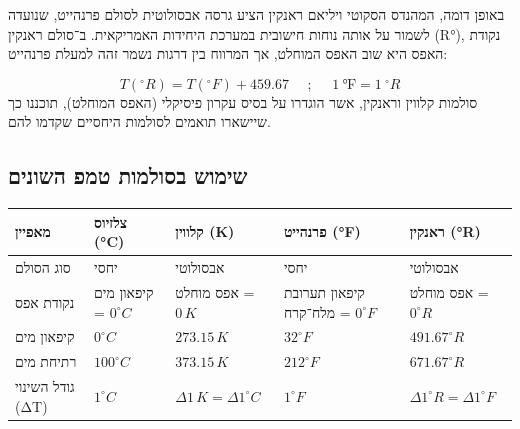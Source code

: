 \documentclass[
  hebrew,
  letterpaper,
  DIV=11,
  numbers=noendperiod]{scrreprt}
\begin{document}
{באופן דומה, המהנדס הסקוטי ויליאם ראנקין הציע גרסה אבסולוטית לסולם
פרנהייט, שנועדה לשמור על אותה נוחות חישובית במערכת היחידות האמריקאית}.
{ב־סולם ראנקין} (R°){,} {נקודת האפס היא שוב האפס המוחלט, אך המרווח בין
דרגות נשמר זהה למעלת פרנהייט}:

\[T({^\circ}R) = T({^\circ}F) + 459.67\ \ \ \ \ \ ;\ \ \ \ \ \ 1\ ℉ = 1\ {^\circ}R\]
{סולמות קלווין וראנקין, אשר הוגדרו על בסיס עקרון פיסיקלי (האפס המוחלט),
תוכננו כך שיישארו תואמים לסולמות היחסיים שקדמו להם}. {}

\subsection{\texorpdfstring{{שימוש בסולמות טמפ\textquotesingle{}
השונים}}{שימוש בסולמות טמפ\textquotesingle{} השונים}}\label{ux5e9ux5d9ux5deux5d5ux5e9-ux5d1ux5e1ux5d5ux5dcux5deux5d5ux5ea-ux5d8ux5deux5e4-ux5d4ux5e9ux5d5ux5e0ux5d9ux5dd}

\begin{longtable}[]{@{}
  >{\raggedright\arraybackslash}p{}
  >{\raggedright\arraybackslash}p{}
  >{\raggedright\arraybackslash}p{}
  >{\raggedright\arraybackslash}p{}
  >{\raggedright\arraybackslash}p{}@{}}
\toprule\noalign{}
\begin{minipage}[b]{\linewidth}\raggedright
מאפיין
\end{minipage} & \begin{minipage}[b]{\linewidth}\raggedright
צלזיוס (°C)
\end{minipage} & \begin{minipage}[b]{\linewidth}\raggedright
קלווין (K)
\end{minipage} & \begin{minipage}[b]{\linewidth}\raggedright
פרנהייט (°F)
\end{minipage} & \begin{minipage}[b]{\linewidth}\raggedright
ראנקין (°R)
\end{minipage} \\
\midrule\noalign{}
\endhead
\bottomrule\noalign{}
\endlastfoot
סוג הסולם & יחסי & אבסולוטי & יחסי & אבסולוטי \\
נקודת אפס & קיפאון מים = \(0^\circ C\) & אפס מוחלט = \(0\,K\) & קיפאון
תערובת מלח־קרח = \(0^\circ F\) & אפס מוחלט = \(0^\circ R\) \\
קיפאון מים & \(0^\circ C\) & \(273.15\,K\) & \(32^\circ F\) &
\(491.67^\circ R\) \\
רתיחת מים & \(100^\circ C\) & \(373.15\,K\) & \(212^\circ F\) &
\(671.67^\circ R\) \\
גודל השינוי (ΔT) & \(1^\circ C\) & \(\Delta 1\,K = \Delta 1^\circ C\) &
\(1^\circ F\) & \(\Delta 1^\circ R = \Delta 1^\circ F\) \\
\end{longtable}
\end{document}
